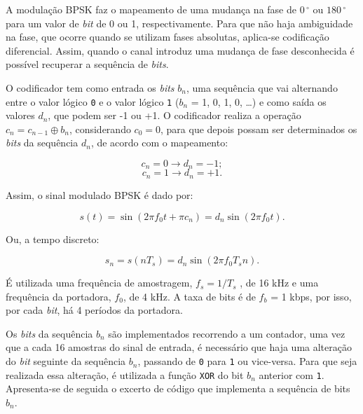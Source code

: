 \documentclass[11pt]{article}
\numberwithin{equation}{section}
\begin{document}
A modulação BPSK faz o mapeamento de uma mudança na fase de $0\,^{\circ}$ ou $180\,^{\circ}$ para um valor de \textit{bit} de 0 ou 1, respectivamente. Para que não haja ambiguidade na fase, que ocorre quando se utilizam fases absolutas, aplica-se codificação diferencial. Assim, quando o canal introduz uma mudança de fase desconhecida é possível recuperar a sequência de \textit{bits}.

O codificador tem como entrada os \textit{bits} $b_n$, uma sequência que vai alternando entre o valor lógico \texttt{0} e o valor lógico \texttt{1} ($b_n$ = 1, 0, 1, 0, \ldots) e como saída os valores $d_n$, que podem ser -1 ou +1. O codificador realiza a operação $c_n = c_{n-1} \oplus b_n$, considerando $c_0 = 0$, para que depois possam ser determinados os \textit{bits} da sequência $d_n$, de acordo com o mapeamento:

\vspace{-3mm}
\begin{equation}
	c_{n} = 0 \to d_{n} = -1;
	\label{eq:cn0}
\end{equation}
\begin{equation}	
	c_{n} = 1 \to d_{n} = +1.
	\label{eq:cn1}  
\end{equation} 

\vspace{1mm}
Assim, o sinal modulado BPSK é dado por:

\vspace{-3mm}
\begin{equation}
	s(t) = \sin (2 \pi f_0 t + \pi c_n) = d_n \sin (2 \pi f_0 t).
\end{equation} 

Ou, a tempo discreto:

\vspace{-3mm}
\begin{equation}
	s_{n} = s(n T_s) = d_n \sin (2\pi f_0 T_s n).
\end{equation} 

\vspace{1mm}
É utilizada uma frequência de amostragem, $f_s=1/T_s$ , de 16 kHz e uma frequência da portadora, $f_0$, de 4 kHz. A taxa de bits é de $f_b$ = 1 kbps, por isso, por cada \textit{bit}, há 4 períodos da portadora.  

Os \textit{bits} da sequência $b_n$ são implementados recorrendo a um contador, uma vez que a cada 16 amostras do sinal de entrada, é necessário que haja uma alteração do \textit{bit} seguinte da sequência $b_n$, passando de \texttt{0} para \texttt{1} ou vice-versa. Para que seja realizada essa alteração, é utilizada a função \texttt{XOR} do bit $b_n$ anterior com \texttt{1}. Apresenta-se de seguida o excerto de código que implementa a sequência de bits $b_n$. 
\end{document}
